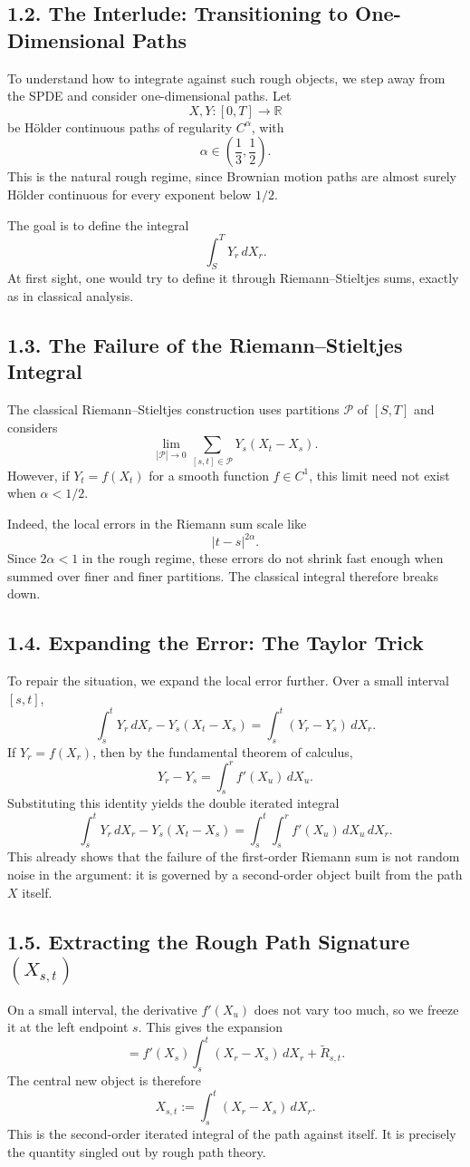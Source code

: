 \documentclass[11pt]{article}
\theoremstyle{definition}
\theoremstyle{remark}
\begin{document}
\subsection*{1.2. The Interlude: Transitioning to One-Dimensional Paths}
To understand how to integrate against such rough objects, we step away from the SPDE and consider one-dimensional paths. Let
\[
X,Y:[0,T]\to\mathbb R
\]
be Hölder continuous paths of regularity \(C^\alpha\), with
\[
\alpha\in\left(\frac13,\frac12\right).
\]
This is the natural rough regime, since Brownian motion paths are almost surely Hölder continuous for every exponent below \(1/2\).

The goal is to define the integral
\[
\int_S^T Y_r\,dX_r.
\]
At first sight, one would try to define it through Riemann--Stieltjes sums, exactly as in classical analysis.

\subsection*{1.3. The Failure of the Riemann--Stieltjes Integral}
The classical Riemann--Stieltjes construction uses partitions \(\mathcal P\) of \([S,T]\) and considers
\[
\lim_{|\mathcal P|\to 0}
\sum_{[s,t]\in\mathcal P} Y_s(X_t-X_s).
\]
However, if \(Y_t=f(X_t)\) for a smooth function \(f\in C^1\), this limit need not exist when \(\alpha<1/2\).

Indeed, the local errors in the Riemann sum scale like
\[
|t-s|^{2\alpha}.
\]
Since \(2\alpha<1\) in the rough regime, these errors do not shrink fast enough when summed over finer and finer partitions. The classical integral therefore breaks down.

\subsection*{1.4. Expanding the Error: The Taylor Trick}
To repair the situation, we expand the local error further. Over a small interval \([s,t]\),
\[
\int_s^t Y_r\,dX_r-Y_s(X_t-X_s)
=
\int_s^t (Y_r-Y_s)\,dX_r.
\]
If \(Y_r=f(X_r)\), then by the fundamental theorem of calculus,
\[
Y_r-Y_s=\int_s^r f'(X_u)\,dX_u.
\]
Substituting this identity yields the double iterated integral
\[
\int_s^t Y_r\,dX_r-Y_s(X_t-X_s)
=
\int_s^t\int_s^r f'(X_u)\,dX_u\,dX_r.
\]
This already shows that the failure of the first-order Riemann sum is not random noise in the argument: it is governed by a second-order object built from the path \(X\) itself.

\subsection*{1.5. Extracting the Rough Path Signature \((X_{s,t})\)}
On a small interval, the derivative \(f'(X_u)\) does not vary too much, so we freeze it at the left endpoint \(s\). This gives the expansion
\[
=
f'(X_s)\int_s^t (X_r-X_s)\,dX_r+\widetilde R_{s,t}.
\]
The central new object is therefore
\[
X_{s,t}
:=
\int_s^t (X_r-X_s)\,dX_r.
\]
This is the second-order iterated integral of the path against itself. It is precisely the quantity singled out by rough path theory.
\end{document}
